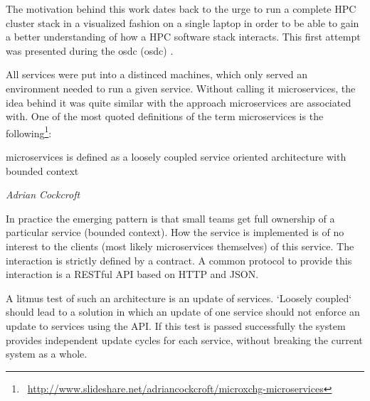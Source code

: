 The motivation behind this work dates back to the urge to run a complete HPC cluster stack in a visualized fashion on a single laptop in order to be able to gain a better understanding of how a HPC software stack interacts.
This first attempt was presented during the \gls{osdc} (\glsdesc{osdc}) .

All services were put into a distinced machines, which only served an environment needed to run a given service.
Without calling it microservices, the idea behind it was quite similar with the approach microservices are associated with.
One of the most quoted definitions of the term microservices is the following\footnote{\Mundus~\url{http://www.slideshare.net/adriancockcroft/microxchg-microservices}}:
\epigraph{microservices is defined as a loosely coupled service oriented architecture with bounded context}{\textit{Adrian Cockcroft}}
In practice the emerging pattern is that small teams get full ownership of a particular service (bounded context).
How the service is implemented is of no interest to the clients (most likely microservices themselves) of this service.
The interaction is strictly defined by a contract. A common protocol to provide this interaction is a RESTful API based on HTTP and JSON.

A litmus test of such an architecture is an update of services. `Loosely coupled` should lead to a solution in which an update of one service
should not enforce an update to services using the API. If this test is passed successfully the system provides
independent update cycles for each service, without breaking the current system as a whole.

